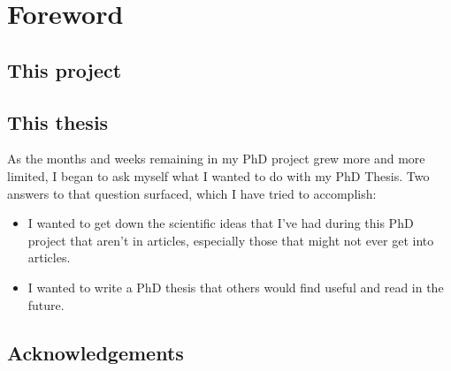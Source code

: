 \section*{Foreword}

\subsection*{This project}


\subsection*{This thesis}

As the months and weeks remaining in my PhD project grew more and more limited, I began to ask myself what I wanted to do with my PhD Thesis. Two answers to that question surfaced, which I have tried to accomplish:
\begin{itemize}
	\item I wanted to get down the scientific ideas that I've had during this PhD project that aren't in articles, especially those that might not ever get into articles.

	\item I wanted to write a PhD thesis that others would find useful and read in the future. 
\end{itemize}


\subsection*{Acknowledgements}

